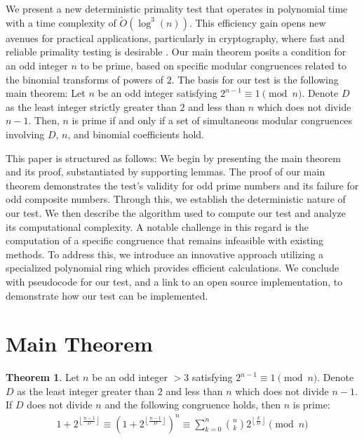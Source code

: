 \documentclass{article}
\theoremstyle{plain}
\theoremstyle{definition}
\newtheorem{theorem}{Theorem}
\begin{document}
We present a new deterministic primality test that operates in polynomial time with a time complexity of $\tilde{O}(\log^3(n))$. This efficiency gain opens new avenues for practical applications, particularly in cryptography, where fast and reliable primality testing is desirable \cite{pomerance1984}. Our main theorem posits a condition for an odd integer \( n \) to be prime, based on specific modular congruences related to the binomial transforms of powers of $2$. The basis for our test is the following main theorem: Let \( n \) be an odd integer satisfying \( 2^{n-1} \equiv 1 \pmod{n} \). Denote \( D \) as the least integer strictly greater than \( 2 \) and less than \( n \) which does not divide \( n-1 \). Then, \( n \) is prime if and only if a set of simultaneous modular congruences involving \( D \), \( n \), and binomial coefficients hold.

This paper is structured as follows: We begin by presenting the main theorem and its proof, substantiated by supporting lemmas. The proof of our main theorem demonstrates the test's validity for odd prime numbers and its failure for odd composite numbers. Through this, we establish the deterministic nature of our test. We then describe the algorithm used to compute our test and analyze its computational complexity. A notable challenge in this regard is the computation of a specific congruence that remains infeasible with existing methods. To address this, we introduce an innovative approach utilizing a specialized polynomial ring which provides efficient calculations. We conclude with pseudocode for our test, and a link to an open source implementation, to demonstrate how our test can be implemented.

\section{Main Theorem}

\begin{theorem}
\label{theorem:1}
Let $n$ be an odd integer $> 3$ satisfying $2^{n-1} \equiv 1 \pmod{n}$. Denote $D$ as the least integer greater than $2$ and less than $n$ which does not divide $n-1$. If $D$ does not divide $n$ and the following congruence holds, then $n$ is prime:
\begin{align}
    1 + 2^{\left\lfloor \frac{n-1}{D} \right\rfloor} \equiv \left(1 + 2^{\left\lfloor \frac{n-1}{D} \right\rfloor}\right)^{n} \equiv \sum_{k=0}^{n} \binom{n}{k} 2^{\left\lfloor \frac{k}{D} \right\rfloor} \pmod{n}
\end{align}
\end{theorem}
\end{document}
